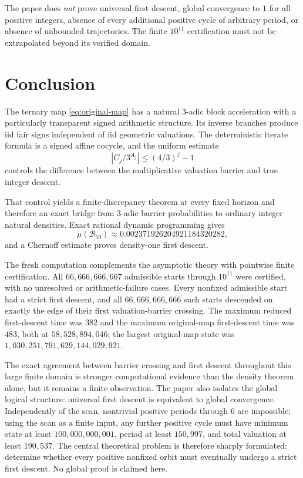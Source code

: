 \documentclass[11pt]{article}
\theoremstyle{definition}
\theoremstyle{remark}
\begin{document}
The paper does \emph{not} prove universal first descent, global convergence to $1$ for all positive integers, absence of every additional positive cycle of arbitrary period, or absence of unbounded trajectories.  The finite $10^{11}$ certification must not be extrapolated beyond its verified domain.

\section{Conclusion}

The ternary map \eqref{eq:original-map} has a natural $3$-adic block acceleration with a particularly transparent signed arithmetic structure.  Its inverse branches produce iid fair signs independent of iid geometric valuations.  The deterministic iterate formula is a signed affine cocycle, and the uniform estimate
\[
\left|C_j/3^{A_j}\right|\le(4/3)^j-1
\]
controls the difference between the multiplicative valuation barrier and true integer descent.

That control yields a finite-discrepancy theorem at every fixed horizon and therefore an exact bridge from $3$-adic barrier probabilities to ordinary integer natural densities.  Exact rational dynamic programming gives
\[
\mu(\mathcal B_{50})\approx0.002371926204921184320282,
\]
and a Chernoff estimate proves density-one first descent.

The fresh computation complements the asymptotic theory with pointwise finite certification.  All $66{,}666{,}666{,}667$ admissible starts through $10^{11}$ were certified, with no unresolved or arithmetic-failure cases.  Every nonfixed admissible start had a strict first descent, and all $66{,}666{,}666{,}666$ such starts descended on exactly the edge of their first valuation-barrier crossing.  The maximum reduced first-descent time was $382$ and the maximum original-map first-descent time was $483$, both at $58{,}528{,}894{,}046$; the largest original-map state was $1{,}030{,}251{,}791{,}629{,}144{,}029{,}921$.

The exact agreement between barrier crossing and first descent throughout this large finite domain is stronger computational evidence than the density theorem alone, but it remains a finite observation.  The paper also isolates the global logical structure: universal first descent is equivalent to global convergence.  Independently of the scan, nontrivial positive periods through $6$ are impossible; using the scan as a finite input, any further positive cycle must have minimum state at least $100{,}000{,}000{,}001$, period at least $150{,}997$, and total valuation at least $190{,}537$.  The central theoretical problem is therefore sharply formulated: determine whether every positive nonfixed orbit must eventually undergo a strict first descent.  No global proof is claimed here.
\end{document}
